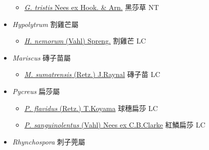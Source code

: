 \begin{itemize}
  \begin{itemize}
        \item[] \href{http://www.theplantlist.org/tpl1.1/search?q=Gahnia+tristis}{\textit{G. tristis} Nees ex Hook. \& Arn.}   黑莎草   NT
  \end{itemize}
 \item[] \textit{Hypolytrum} 割雞芒屬
                                
  \begin{itemize}
        \item[] \href{http://www.theplantlist.org/tpl1.1/search?q=Hypolytrum+nemorum}{\textit{H. nemorum} (Vahl) Spreng.}   割雞芒   LC
  \end{itemize}
 \item[] \textit{Mariscus} 磚子苗屬
                                
  \begin{itemize}
        \item[] \href{http://www.theplantlist.org/tpl1.1/search?q=Mariscus+sumatrensis}{\textit{M. sumatrensis} (Retz.) J.Raynal}   磚子苗   LC
  \end{itemize}
 \item[] \textit{Pycreus} 扁莎屬
                                
  \begin{itemize}
        \item[] \href{http://www.theplantlist.org/tpl1.1/search?q=Pycreus+flavidus}{\textit{P. flavidus} (Retz.) T.Koyama}   球穗扁莎   LC
        \item[] \href{http://www.theplantlist.org/tpl1.1/search?q=Pycreus+sanguinolentus}{\textit{P. sanguinolentus} (Vahl) Nees ex C.B.Clarke}   紅鱗扁莎   LC
  \end{itemize}
 \item[] \textit{Rhynchospora} 刺子莞屬
                                

\end{itemize}
